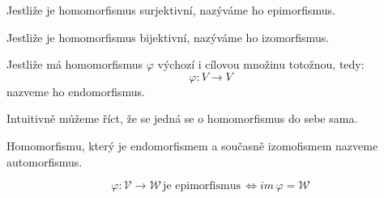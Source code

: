 \begin{definition}[Epimorfismus]
    Jestliže je homomorfismus surjektivní, nazýváme ho epimorfismus.
\end{definition}

\begin{definition}[Izomorfismus]
    Jestliže je homomorfismus bijektivní, nazýváme ho izomorfismus.
\end{definition}

\begin{definition}[Endomorfismus]
    Jestliže má homomorfismus $\varphi$ výchozí i cílovou množinu totožnou, tedy:
    $$\varphi: V \rightarrow V$$
    nazveme ho endomorfismus.

    Intuitivně můžeme říct, že se jedná se o homomorfismus
    do sebe sama.
\end{definition}

\begin{definition}[Automorfismus]
    Homomorfismu, který je endomorfismem a současně izomofismem nazveme automorfismus.
\end{definition}

\begin{theorem}
    $$\varphi: \mathcal{V} \rightarrow \mathcal{W}\,\text{je epimorfismus}\,\Leftrightarrow
    im\,\varphi = \mathcal{W}
    $$
\end{theorem}


